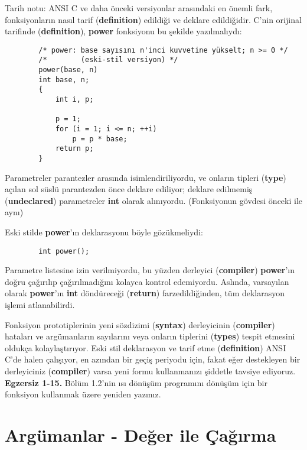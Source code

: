 \documentclass[a4paper,12pt,oneside]{book}
\begin{document}
\par Tarih notu: ANSI C ve daha önceki versiyonlar arasındaki en önemli fark, fonksiyonların nasıl tarif (\textbf{definition}) edildiği ve deklare edildiğidir. C'nin orijinal tarifinde (\textbf{definition}), \textbf{power} fonksiyonu bu şekilde yazılmalıydı:
\begin{lstlisting}
		/* power: base sayısını n'inci kuvvetine yükselt; n >= 0 */
		/*		  (eski-stil versiyon) */
		power(base, n)
		int base, n;
		{
			int i, p;

			p = 1;
			for (i = 1; i <= n; ++i)
				p = p * base;
			return p;
		}
\end{lstlisting}
Parametreler parantezler arasında isimlendiriliyordu, ve onların tipleri (\textbf{type}) açılan sol süslü parantezden önce deklare ediliyor; deklare edilmemiş (\textbf{undeclared}) parametreler \textbf{int} olarak alınıyordu. (Fonksiyonun gövdesi önceki ile aynı)
\par Eski stilde \textbf{power}'ın deklarasyonu böyle gözükmeliydi:
\begin{lstlisting}
		int power();
\end{lstlisting}
Parametre listesine izin verilmiyordu, bu yüzden derleyici (\textbf{compiler}) \textbf{power}'ın doğru çağırılıp çağırılmadığını kolayca kontrol edemiyordu. Aslında, varsayılan olarak \textbf{power}'ın \textbf{int} döndüreceği (\textbf{return}) farzedildiğinden, tüm deklarasyon işlemi atlanabilirdi.
\par Fonksiyon prototiplerinin yeni sözdizimi (\textbf{syntax}) derleyicinin (\textbf{compiler}) hataları ve argümanların sayılarını veya onların tiplerini (\textbf{types}) tespit etmesini oldukça kolaylaştırıyor. Eski stil deklarasyon ve tarif etme (\textbf{definition}) ANSI C'de halen çalışıyor, en azından bir geçiş periyodu için, fakat eğer destekleyen bir derleyiciniz (\textbf{compiler}) varsa yeni formu kullanmanızı şiddetle tavsiye ediyoruz. \\


\textbf{Egzersiz 1-15.} Bölüm 1.2'nin ısı dönüşüm programını dönüşüm için bir fonksiyon kullanmak üzere yeniden yazınız.

\section{Argümanlar - Değer ile Çağırma}
\end{document}

